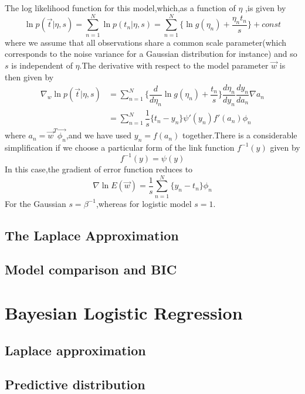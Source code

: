 The log likelihood function for this model,which,as a function of $\eta$ ,is given by 
\begin{equation}
\ln p(\vec{t}|\eta,s) = \sum_{n=1}^{N}\ln p(t_n|\eta,s) = \sum_{n=1}^{N}\{\ln g(\eta_n)+\dfrac{\eta_n t_n}{s} \} + const
\end{equation}
where we assume that all observations share a common scale parameter(which corresponds to the noise variance for a Gaussian distribution for instance) and so $s$ is independent of $\eta$.The derivative with respect to the model parameter $\vec{w}$ is then given by 
\begin{align}
\nabla_w\ln p(\vec{t}|\eta,s) 
&=\sum_{n=1}^{N}\{\dfrac{d}{d\eta_n}\ln g(\eta_n)+\dfrac{t_n}{s} \} \dfrac{d\eta_n}{dy_n}\dfrac{dy_n}{da_n}\nabla a_n \\
&= \sum_{n=1}^{N}\dfrac{1}{s}\{t_n-y_n \}\psi'(y_n)f'(a_n)\phi_n
\end{align}
where $a_n=\vec{w}^T\vec{\phi_n}$,and we have used $y_n=f(a_n)$ together.There is a considerable simplification if we choose a particular form of the link function $f^{-1}(y)$ given by
\begin{equation}
f^{-1}(y) = \psi(y)
\end{equation}
In this case,the gradient of error function reduces to 
\begin{equation}
\nabla\ln E(\vec{w}) = \dfrac{1}{s}\sum_{n=1}^{N}\{y_n-t_n\}\phi_n
\end{equation}
For the Gaussian $s=\beta^{-1}$,whereas for logistic model $s=1$.



\subsection{The Laplace Approximation}
\subsection{Model comparison and BIC}

\section{Bayesian Logistic Regression}
\subsection{Laplace approximation}
\subsection{Predictive distribution}
